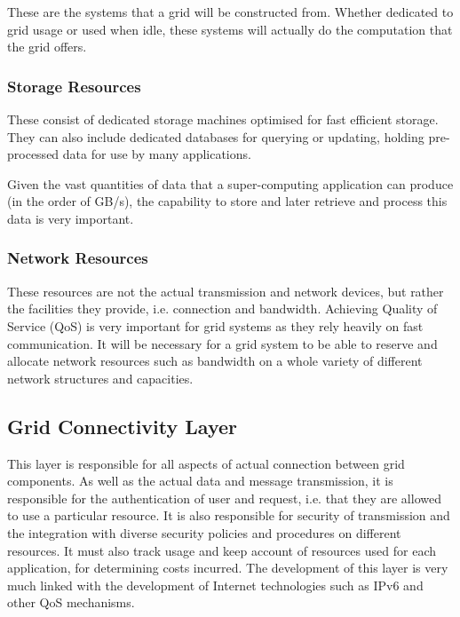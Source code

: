 These are the systems that a grid will be constructed from.  Whether dedicated
to grid usage or used when idle, these systems will actually do the computation
that the grid offers.

\subsubsection{Storage Resources}

These consist of dedicated storage machines optimised for fast efficient
storage. They can also include dedicated databases for querying or updating,
holding pre-processed data for use by many applications.

Given the vast quantities of data that a super-computing application can
produce (in the order of GB/s), the capability to store and later retrieve and
process this data is very important.


\subsubsection{Network Resources}

These resources are not the actual transmission and network devices, but rather the
facilities they provide, i.e. connection and bandwidth.  Achieving Quality of
Service (QoS) is very important for grid systems as they rely heavily on fast
communication.  It will be necessary for a grid system to be able to reserve
and allocate network resources such as bandwidth on a whole variety of
different network structures and capacities.



\subsection{Grid Connectivity Layer}

This layer is responsible for all aspects of actual connection between grid
components.  As well as the actual data and message transmission, it is
responsible for the authentication of user and request, i.e. that they are
allowed to use a particular resource.  It is also responsible for security of
transmission and the integration with diverse security policies and procedures
on different resources.  It must also track usage and keep account of
resources used for each application, for determining costs incurred. The
development of this layer is very much linked with the development of Internet
technologies such as IPv6 and other QoS mechanisms.



